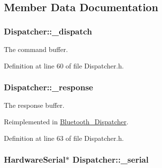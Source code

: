 \subsection{\-Member \-Data \-Documentation}
\hypertarget{class_dispatcher_aaedb32e8b575e70f297933122fdf7fe0}{
\subsubsection[{\-\_\-dispatch}]{ {\bf \-Dispatcher\-::\-\_\-dispatch}}}\label{class_dispatcher_aaedb32e8b575e70f297933122fdf7fe0}


\-The command buffer. 



\-Definition at line 60 of file \-Dispatcher.\-h.

\hypertarget{class_dispatcher_a0e3c3d9054c4d8180aa56655bb6206a2}{
\subsubsection[{\-\_\-response}]{ {\bf \-Dispatcher\-::\-\_\-response}}}\label{class_dispatcher_a0e3c3d9054c4d8180aa56655bb6206a2}


\-The response buffer. 



\-Reimplemented in \hyperlink{class_bluetooth___dispatcher_a37efed7ffe1b2bcc846ade2406174796}{\-Bluetooth\-\_\-\-Dispatcher}.



\-Definition at line 63 of file \-Dispatcher.\-h.

\hypertarget{class_dispatcher_ab761cd7589c1d5fda8ff1b5ec4ce679f}{
\subsubsection[{\-\_\-serial}]{\setlength{\rightskip}{0pt plus 5cm}\-Hardware\-Serial$\ast$ {\bf \-Dispatcher\-::\-\_\-serial}}}\label{class_dispatcher_ab761cd7589c1d5fda8ff1b5ec4ce679f}


